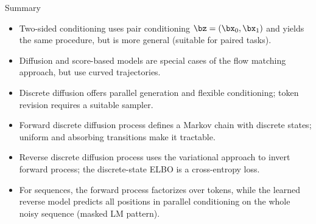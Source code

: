 \documentclass{beamer}
\begin{document}
\begin{frame}{Summary}
	\begin{itemize}
		\item Two-sided conditioning uses pair conditioning $\bz = (\bx_0, \bx_1)$ and yields the same procedure, but is more general (suitable for paired tasks).
		\vfill
		\item Diffusion and score-based models are special cases of the flow matching approach, but use curved trajectories.
		\vfill
		\item Discrete diffusion offers parallel generation and flexible conditioning; token revision requires a suitable sampler.
		\vfill
		\item Forward discrete diffusion process defines a Markov chain with discrete states; uniform and absorbing transitions make it tractable.
		\vfill
		\item Reverse discrete diffusion process uses the variational approach to invert forward process; the discrete-state ELBO is a cross-entropy loss.
		\vfill
		\item For sequences, the forward process factorizes over tokens, while the learned reverse model predicts all positions in parallel conditioning on the whole noisy sequence (masked LM pattern).
	\end{itemize}
\end{frame}
\end{document}
